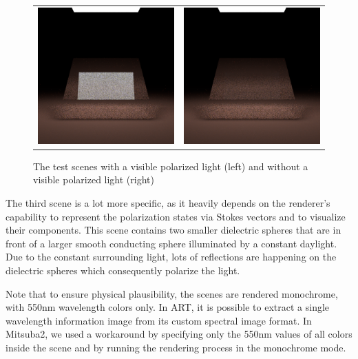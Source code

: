 \begin{figure}[h]
	\begin{tabular}{cc}
		\includegraphics[width=.45\linewidth]{img/polarizing_plane_90.png}
		&
		\includegraphics[width=.45\linewidth]{img/polarizing_plane_0.png}
	\end{tabular}
	\caption{The test scenes with a visible polarized light (left) and without a visible polarized light (right)}
	\label{fig:polar_planes}
\end{figure}

The third scene is a lot more specific, as it heavily depends on the renderer's capability to represent the polarization states via Stokes vectors and to visualize their components. This scene contains two smaller dielectric spheres that are in front of a larger smooth conducting sphere illuminated by a constant daylight. Due to the constant surrounding light, lots of reflections are happening on the dielectric spheres which consequently polarize the light.

Note that to ensure physical plausibility, the scenes are rendered monochrome, with 550nm wavelength colors only. In ART, it is possible to extract a single wavelength information image from its custom spectral image format. In Mitsuba2, we used a workaround by specifying only the 550nm values of all colors inside the scene and by running the rendering process in the monochrome mode.

